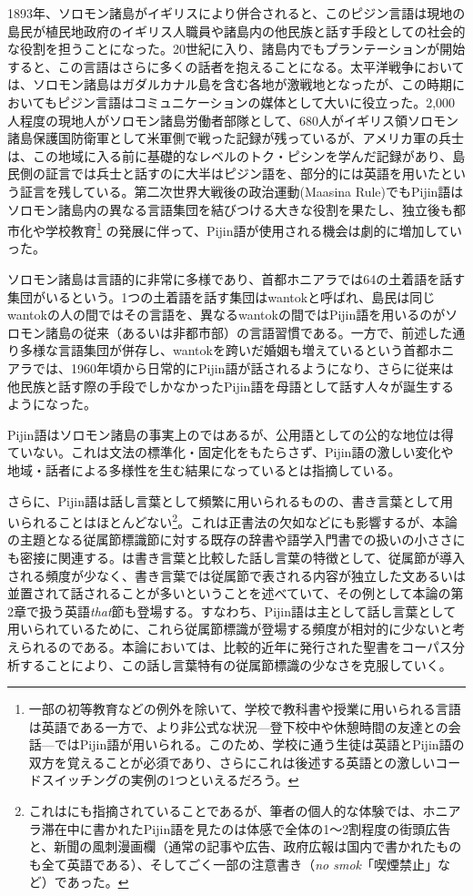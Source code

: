 1893年、ソロモン諸島がイギリスにより併合されると、このピジン言語は現地の島民が植民地政府のイギリス人職員や諸島内の他民族と話す手段としての社会的な役割を担うことになった。20世紀に入り、諸島内でもプランテーションが開始すると、この言語はさらに多くの話者を抱えることになる。太平洋戦争においては、ソロモン諸島はガダルカナル島を含む各地が激戦地となったが、この時期においてもピジン言語はコミュニケーションの媒体として大いに役立った。2,000人程度の現地人がソロモン諸島労働者部隊として、680人がイギリス領ソロモン諸島保護国防衛軍として米軍側で戦った記録が残っているが、アメリカ軍の兵士は、この地域に入る前に基礎的なレベルのトク・ピシンを学んだ記録があり、島民側の証言では兵士と話すのに大半はピジン語を、部分的には英語を用いたという証言を残している。第二次世界大戦後の政治運動(Maasina Rule)でもPijin語はソロモン諸島内の異なる言語集団を結びつける大きな役割を果たし、独立後も都市化や学校教育\footnote{
一部の初等教育などの例外を除いて、学校で教科書や授業に用いられる言語は英語である一方で、より非公式な状況---登下校中や休憩時間の友達との会話---ではPijin語が用いられる。このため、学校に通う生徒は英語とPijin語の双方を覚えることが必須であり、さらにこれは後述する英語との激しいコードスイッチングの実例の1つといえるだろう。
}
の発展に伴って、Pijin語が使用される機会は劇的に増加していった。

ソロモン諸島は言語的に非常に多様であり、首都ホニアラでは64の土着語を話す集団がいるという\citep{nativization}。1つの土着語を話す集団はwantokと呼ばれ、島民は同じwantokの人の間ではその言語を、異なるwantokの間ではPijin語を用いるのがソロモン諸島の従来（あるいは非都市部）の言語習慣である。一方で、前述した通り多様な言語集団が併存し、wantokを跨いだ婚姻も増えているという首都ホニアラでは、1960年頃から日常的にPijin語が話されるようになり、さらに従来は他民族と話す際の手段でしかなかったPijin語を母語として話す人々が誕生するようになった。

Pijin語はソロモン諸島の事実上のではあるが、公用語としての公的な地位は得ていない。これは文法の標準化・固定化をもたらさず、Pijin語の激しい変化や地域・話者による多様性を生む結果になっていると\cite{phonology}は指摘している。

さらに、Pijin語は話し言葉として頻繁に用いられるものの、書き言葉として用いられることはほとんどない\footnote{これは\cite{phonology}にも指摘されていることであるが、筆者の個人的な体験では、ホニアラ滞在中に書かれたPijin語を見たのは体感で全体の1～2割程度の街頭広告と、新聞の風刺漫画欄（通常の記事や広告、政府広報は国内で書かれたものも全て英語である）、そしてごく一部の注意書き（\textit{no smok}「喫煙禁止」など）であった。}。これは正書法の欠如などにも影響するが、本論の主題となる従属節標識節に対する既存の辞書や語学入門書での扱いの小ささにも密接に関連する。\cite{chafe}は書き言葉と比較した話し言葉の特徴として、従属節が導入される頻度が少なく、書き言葉では従属節で表される内容が独立した文あるいは並置されて話されることが多いということを述べていて、その例として本論の第2章で扱う英語\textit{that}節も登場する。すなわち、Pijin語は主として話し言葉として用いられているために、これら従属節標識が登場する頻度が相対的に少ないと考えられるのである。本論においては、比較的近年に発行された聖書をコーパス分析することにより、この話し言葉特有の従属節標識の少なさを克服していく。

